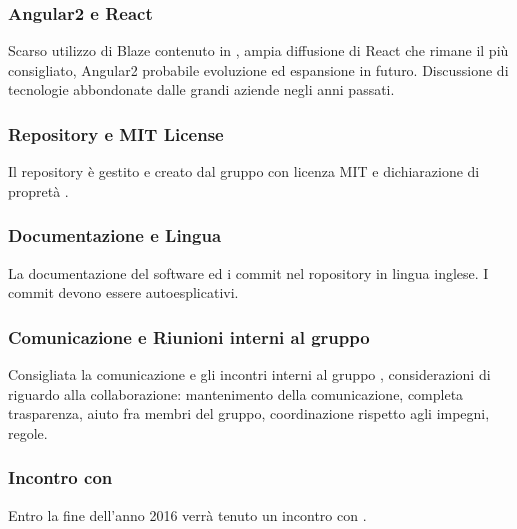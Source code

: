 \subsubsection{Angular2 e React}
Scarso utilizzo di Blaze contenuto in , ampia diffusione di React che rimane il più consigliato, Angular2 probabile evoluzione ed espansione in futuro.
Discussione di tecnologie abbondonate dalle grandi aziende negli anni passati.

\subsubsection{Repository e MIT License}
Il repository è gestito e creato dal gruppo \GroupName con licenza MIT e dichiarazione di propretà \Proponente.

\subsubsection{Documentazione e Lingua}
La documentazione del software ed i commit nel ropository in lingua inglese. I commit devono essere autoesplicativi.

\subsubsection{Comunicazione e Riunioni interni al gruppo \GroupName}
Consigliata la comunicazione e gli incontri interni al gruppo \GroupName, considerazioni di \Proponente riguardo alla collaborazione: mantenimento della comunicazione, completa trasparenza, aiuto fra membri del gruppo, coordinazione rispetto agli impegni, regole. 

\subsubsection{Incontro con \Proponente}
Entro la fine dell'anno 2016 verrà tenuto un incontro con \Proponente.

\clearpage
